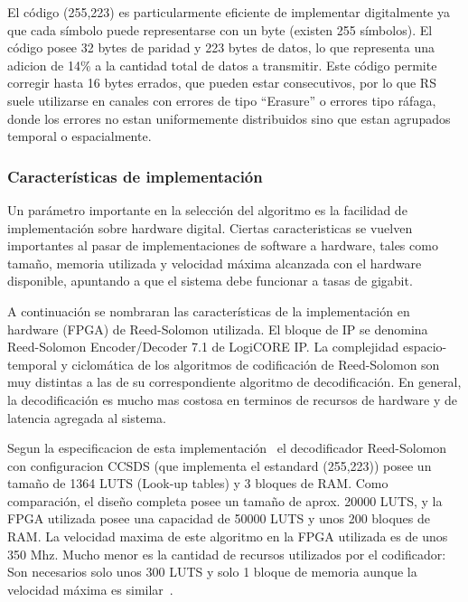 El código (255,223) es particularmente eficiente de implementar digitalmente ya que cada símbolo puede representarse con un byte (existen 255 símbolos). El código posee 32 bytes de paridad y 223 bytes de datos, lo que representa una adicion de 14\% a la cantidad total de datos a transmitir. Este código permite corregir hasta 16 bytes errados, que pueden estar consecutivos, por lo que RS suele utilizarse en canales con errores de tipo ``Erasure'' o errores tipo ráfaga, donde los errores no estan uniformemente distribuidos sino que estan agrupados temporal o espacialmente.


\subsubsection{Características de implementación}
Un parámetro importante en la selección del algoritmo es la facilidad de implementación sobre hardware digital. Ciertas caracteristicas se vuelven importantes al pasar de implementaciones de software a hardware, tales como tamaño, memoria utilizada y velocidad máxima alcanzada con el hardware disponible, apuntando a que el sistema debe funcionar a tasas de gigabit.

A continuación se nombraran las características de la implementación en hardware (FPGA) de Reed-Solomon utilizada.
El bloque de IP se denomina Reed-Solomon Encoder/Decoder 7.1 de LogiCORE IP. La complejidad espacio-temporal y ciclomática de los algoritmos de codificación de Reed-Solomon son muy distintas a las de su correspondiente algoritmo de decodificación. En general, la decodificación es mucho mas costosa en terminos de recursos de hardware y de latencia agregada al sistema.

Segun la especificacion de esta implementación~\cite{Xilinx:DS252} el decodificador Reed-Solomon con configuracion CCSDS (que implementa el estandard (255,223)) posee un tamaño de 1364 LUTS (Look-up tables) y 3 bloques de RAM. Como comparación, el diseño completa posee un tamaño de aprox. 20000 LUTS, y la FPGA utilizada posee una capacidad de 50000 LUTS y unos 200 bloques de RAM. La velocidad maxima de este algoritmo en la FPGA utilizada es de unos 350 Mhz.
Mucho menor es la cantidad de recursos utilizados por el codificador: Son necesarios solo unos 300 LUTS y solo 1 bloque de memoria aunque la velocidad máxima es similar~\cite{Xilinx:DS251}.

